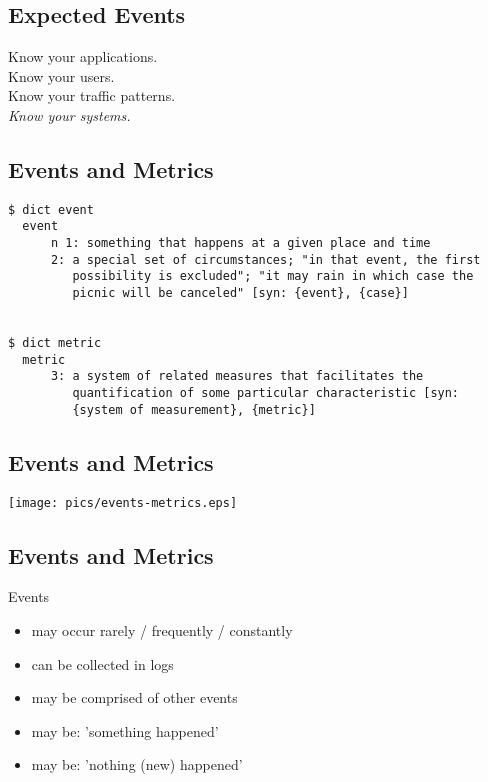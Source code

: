 \documentclass[xga]{xdvislides}
\begin{document}
\subsection{Expected Events}
\vspace*{\fill}
\Huge
\begin{center}
Know your applications. \\
\vspace{.4in}
Know your users. \\
\vspace{.4in}
Know your traffic patterns. \\
\vspace{.4in}
{\em Know your systems.}
\end{center}
\Normalsize
\vspace*{\fill}

\subsection{Events and Metrics}
\vspace*{\fill}
\begin{verbatim}
$ dict event
  event
      n 1: something that happens at a given place and time
      2: a special set of circumstances; "in that event, the first
         possibility is excluded"; "it may rain in which case the
         picnic will be canceled" [syn: {event}, {case}]


$ dict metric
  metric
      3: a system of related measures that facilitates the
         quantification of some particular characteristic [syn:
         {system of measurement}, {metric}]

\end{verbatim}
\vspace*{\fill}

\subsection{Events and Metrics}
\begin{center}
	\texttt{[image: pics/events-metrics.eps]}
\end{center}

\subsection{Events and Metrics}
Events
\begin{itemize}
	\item may occur rarely / frequently / constantly
	\item can be collected in logs
	\item may be comprised of other events
	\item may be: ’something happened’
	\item may be: ’nothing (new) happened’
\end{itemize}
\addvspace{.5in}
\end{document}
